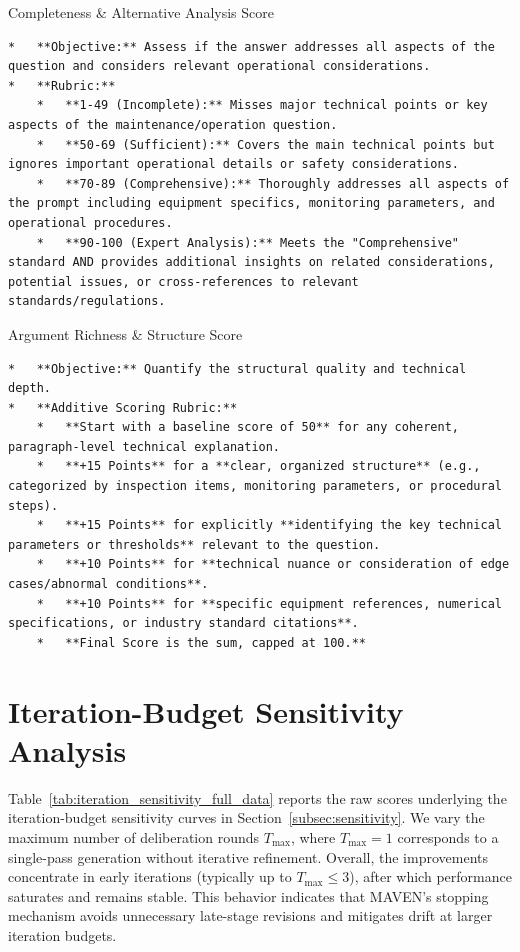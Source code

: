 \documentclass{article}
\begin{document}
\begin{promptbox}[colback=Plum!5,colframe=Plum!35!gray,colbacktitle=Plum!55]{Completeness \& Alternative Analysis Score}
\begin{lstlisting}
*   **Objective:** Assess if the answer addresses all aspects of the question and considers relevant operational considerations.
*   **Rubric:**
    *   **1-49 (Incomplete):** Misses major technical points or key aspects of the maintenance/operation question.
    *   **50-69 (Sufficient):** Covers the main technical points but ignores important operational details or safety considerations.
    *   **70-89 (Comprehensive):** Thoroughly addresses all aspects of the prompt including equipment specifics, monitoring parameters, and operational procedures.
    *   **90-100 (Expert Analysis):** Meets the "Comprehensive" standard AND provides additional insights on related considerations, potential issues, or cross-references to relevant standards/regulations.
\end{lstlisting}
\end{promptbox}

\begin{promptbox}[colback=Aquamarine!5,colframe=Aquamarine!35!gray,colbacktitle=Aquamarine!55]{Argument Richness \& Structure Score}
\begin{lstlisting}
*   **Objective:** Quantify the structural quality and technical depth.
*   **Additive Scoring Rubric:**
    *   **Start with a baseline score of 50** for any coherent, paragraph-level technical explanation.
    *   **+15 Points** for a **clear, organized structure** (e.g., categorized by inspection items, monitoring parameters, or procedural steps).
    *   **+15 Points** for explicitly **identifying the key technical parameters or thresholds** relevant to the question.
    *   **+10 Points** for **technical nuance or consideration of edge cases/abnormal conditions**.
    *   **+10 Points** for **specific equipment references, numerical specifications, or industry standard citations**.
    *   **Final Score is the sum, capped at 100.**
\end{lstlisting}
\end{promptbox}

\section{Iteration-Budget Sensitivity Analysis}
\label{sec:appendix_full_results}

Table~\ref{tab:iteration_sensitivity_full_data} reports the raw scores underlying the iteration-budget sensitivity curves in Section~\ref{subsec:sensitivity}. We vary the maximum number of deliberation rounds $T_{\max}$, where $T_{\max}=1$ corresponds to a single-pass generation without iterative refinement. Overall, the improvements concentrate in early iterations (typically up to $T_{\max}\le 3$), after which performance saturates and remains stable. This behavior indicates that MAVEN’s stopping mechanism avoids unnecessary late-stage revisions and mitigates drift at larger iteration budgets.
\end{document}
